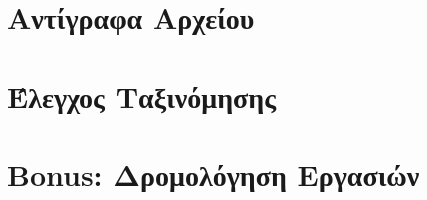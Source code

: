 \documentclass[a4paper,10pt]{article} \usepackage{anysize}
\begin{document}
\section{Αντίγραφα Αρχείου}


\vspace{3cm}

\section{Έλεγχος Ταξινόμησης}


\vspace{3cm}

\section{Bonus: Δρομολόγηση Εργασιών}

\end{document}
